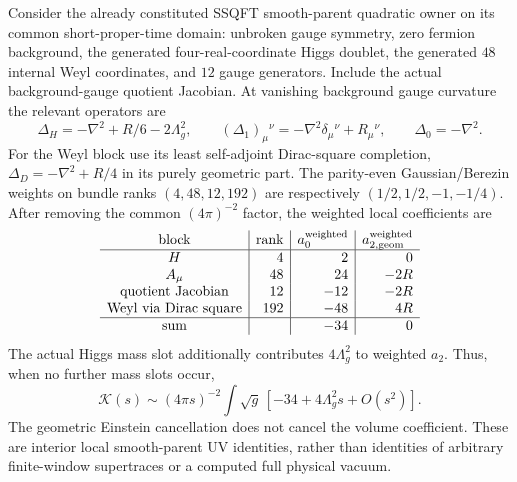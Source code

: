 \documentclass[12pt,a4paper]{article}
\begin{document}
\begin{theorem}
\label{p4:thm:v2216-graded-matter-uv}
Consider the already constituted SSQFT smooth-parent quadratic owner on its
common short-proper-time domain: unbroken gauge symmetry, zero fermion
background, the generated four-real-coordinate Higgs doublet, the generated
$48$ internal Weyl coordinates, and $12$ gauge generators. Include the
actual background-gauge quotient Jacobian. At vanishing background gauge
curvature the relevant operators are
\[
 \Delta_H=-\nabla^2+R/6-2\Lambda_g^2,\qquad
 (\Delta_1)_\mu{}^\nu=-\nabla^2\delta_\mu{}^\nu+R_\mu{}^\nu,
 \qquad \Delta_0=-\nabla^2.
\]
For the Weyl block use its least self-adjoint Dirac-square completion,
$\Delta_D=-\nabla^2+R/4$ in its purely geometric part. The parity-even
Gaussian/Berezin weights on bundle ranks $(4,48,12,192)$ are respectively
$(1/2,1/2,-1,-1/4)$. After removing the common $(4\pi)^{-2}$ factor,
the weighted local coefficients are
\begin{equation}
\label{p4:eq:v2216-graded-matter-table}
\begin{array}{c|r|r|r}
 \text{block}&\text{rank}&a_0^{\rm weighted}&a_{2,\rm geom}^{\rm weighted}
 \\\hline
 H&4&2&0\\
 A_\mu&48&24&-2R\\
 \text{quotient Jacobian}&12&-12&-2R\\
 \text{Weyl via Dirac square}&192&-48&4R\\\hline
 \text{sum}&&-34&0
\end{array}
\end{equation}
The actual Higgs mass slot additionally contributes $4\Lambda_g^2$ to
weighted $a_2$. Thus, when no further mass slots occur,
\[
 \boxed{\mathcal K(s)\sim(4\pi s)^{-2}\int\sqrt g\,
 [-34+4\Lambda_g^2s+O(s^2)].}
\]
The geometric Einstein cancellation does not cancel the volume coefficient.
These are interior local smooth-parent UV identities, rather than identities of
arbitrary finite-window supertraces or a computed full physical vacuum.
\end{theorem}
\end{document}
